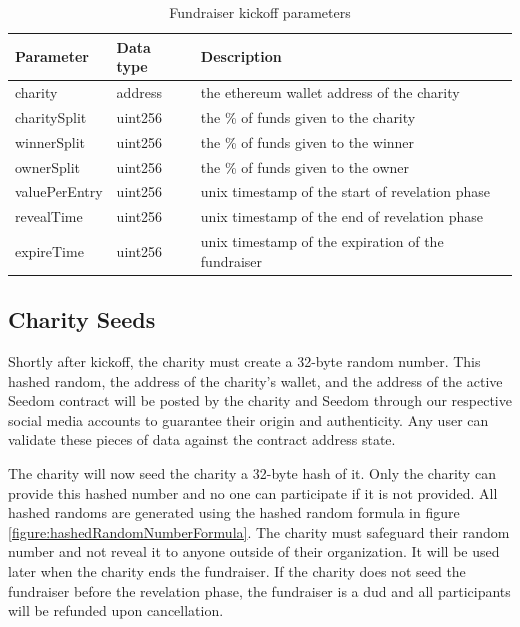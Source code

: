 \documentclass[11pt]{article}
\begin{document}
\begin{table}[H]
\begin{center}
\begin{tabular}{| l | l | l |}
\hline
\textbf{Parameter} & \textbf{Data type} & \textbf{Description} \\ \hline
charity & address & the ethereum wallet address of the charity \\ \hline
charitySplit & uint256 & the \% of funds given to the charity \\ \hline
winnerSplit & uint256 & the \% of funds given to the winner \\ \hline
ownerSplit & uint256 & the \% of funds given to the owner \\ \hline
valuePerEntry & uint256 & unix timestamp of the start of revelation phase \\ \hline
revealTime & uint256 & unix timestamp of the end of revelation phase \\ \hline
expireTime & uint256 & unix timestamp of the expiration of the fundraiser \\ \hline
\end{tabular}
\caption{Fundraiser kickoff parameters}
\label{tab:fundraiserKickoffParameters}
\end{center}
\end{table}

\subsection{Charity Seeds}
Shortly after kickoff, the charity must create a 32-byte random number. This hashed random, the address of the charity's wallet, and the address of the active Seedom contract will be posted by the charity and Seedom through our respective social media accounts to guarantee their origin and authenticity. Any user can validate these pieces of data against the contract address state.

The charity will now seed the charity a 32-byte hash of it. Only the charity can provide this hashed number and no one can participate if it is not provided. All hashed randoms are generated using the hashed random formula in figure \ref{figure:hashedRandomNumberFormula}. The charity must safeguard their random number and not reveal it to anyone outside of their organization. It will be used later when the charity ends the fundraiser. If the charity does not seed the fundraiser before the revelation phase, the fundraiser is a dud and all participants will be refunded upon cancellation.
\end{document}
